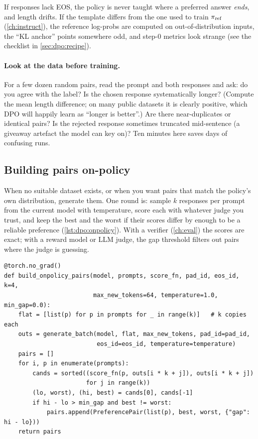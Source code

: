 \begin{pitfall}
If responses lack EOS, the policy is never taught where a preferred answer \emph{ends}, and
length drifts. If the template differs from the one used to train $\pi_{\text{ref}}$ (\cref{ch:instruct}),
the reference log-probs are computed on out-of-distribution inputs, the ``KL anchor'' points
somewhere odd, and step-0 metrics look strange (see the checklist in \cref{sec:dpo:recipe}).
\end{pitfall}

\paragraph{Look at the data before training.} For a few dozen random pairs, read the prompt and
both responses and ask: do you agree with the label? Is the chosen response systematically
longer? (Compute the mean length difference; on many public datasets it is clearly positive,
which DPO will happily learn as ``longer is better''.) Are there near-duplicates or identical
pairs? Is the rejected response sometimes truncated mid-sentence (a giveaway artefact the model can
key on)? Ten minutes here saves days of confusing runs.

\subsection{Building pairs on-policy}\label{sec:dpo:onpolicy}

When no suitable dataset exists, or when you want pairs that match the policy's own
distribution, generate them. One round is: sample $k$ responses per prompt from the current model
with temperature, score each with whatever judge you trust, and keep the best and the worst if their
scores differ by enough to be a reliable preference (\cref{lst:dpo:onpolicy}). With a verifier
(\cref{ch:eval}) the scores are exact; with a reward model or LLM judge, the gap threshold filters
out pairs where the judge is guessing.

\begin{lstlisting}[caption={One round of on-policy pair construction (\ident{llmsys.prefopt.build_onpolicy_pairs}, abridged). Generation uses the batched, left-padded, KV-cached path from \cref{ch:serving}.},label={lst:dpo:onpolicy}]
@torch.no_grad()
def build_onpolicy_pairs(model, prompts, score_fn, pad_id, eos_id, k=4,
                         max_new_tokens=64, temperature=1.0, min_gap=0.0):
    flat = [list(p) for p in prompts for _ in range(k)]   # k copies each
    outs = generate_batch(model, flat, max_new_tokens, pad_id=pad_id,
                          eos_id=eos_id, temperature=temperature)
    pairs = []
    for i, p in enumerate(prompts):
        cands = sorted((score_fn(p, outs[i * k + j]), outs[i * k + j])
                       for j in range(k))
        (lo, worst), (hi, best) = cands[0], cands[-1]
        if hi - lo > min_gap and best != worst:
            pairs.append(PreferencePair(list(p), best, worst, {"gap": hi - lo}))
    return pairs
\end{lstlisting}

